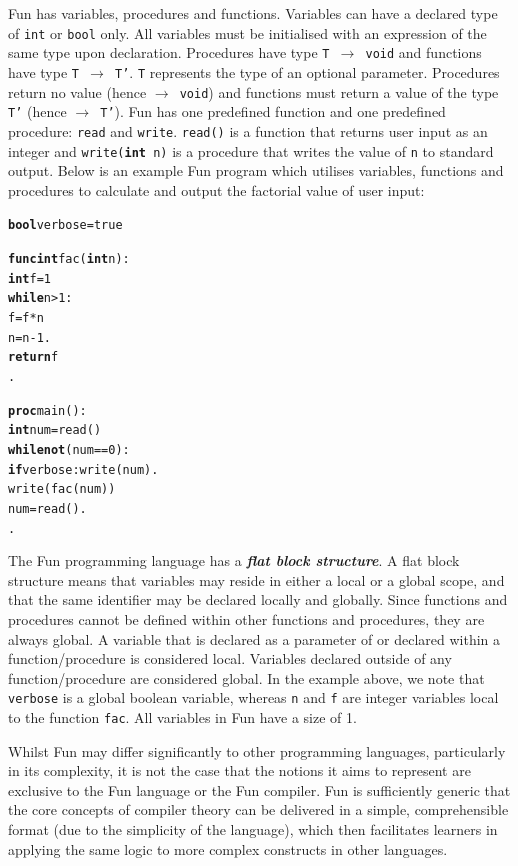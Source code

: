 \documentclass{l4proj}
\begin{document}
Fun has variables, procedures and functions. Variables can have a declared type of \texttt{int} or \texttt{bool} only. All variables must be initialised with an expression of the same type upon declaration. Procedures have type \texttt{T $\rightarrow$ void} and functions have type \texttt{T $\rightarrow$ T'}. \texttt{T} represents the type of an optional parameter. Procedures return no value (hence \texttt{$\rightarrow$ void}) and functions must return a value of the type \texttt{T'} (hence \texttt{$\rightarrow$ T'}). Fun has one predefined function and one predefined procedure: \texttt{read} and \texttt{write}. \texttt{read()} is a function that returns user input as an integer and \texttt{write(\textbf{int} n)} is a procedure that writes the value of \texttt{n} to standard output. Below is an example Fun program which utilises variables, functions and procedures to calculate and output the factorial value of user input:
\begin{alltt}
\textbf{bool} verbose = true

\textbf{func int} fac (\textbf{int} n):    
    \textbf{int} f = 1   
    \textbf{while} n > 1:    
        f = f*n   
        n = n-1  .   
    \textbf{return} f  
.  

\textbf{proc} main ():  
    \textbf{int} num = read()   
    \textbf{while not} (num == 0):    
        \textbf{if} verbose: write(num) .    
        write(fac(num))    
        num = read() .  
.
 \end{alltt}
 
The Fun programming language has a \textit{\textbf{flat block structure}}. A flat block structure means that variables may reside in either a local or a global scope, and that the same identifier may be declared locally and globally. Since functions and procedures cannot be defined within other functions and procedures, they are always global. A variable that is declared as a parameter of or declared within a function/procedure is considered local. Variables declared outside of any function/procedure are considered global. In the example above, we note that \texttt{verbose} is a global boolean variable, whereas \texttt{n} and \texttt{f} are integer variables local to the function \texttt{fac}. All variables in Fun have a size of 1.

Whilst Fun may differ significantly to other programming languages, particularly in its complexity, it is not the case that the notions it aims to represent are exclusive to the Fun language or the Fun compiler. Fun is sufficiently generic that the core concepts of compiler theory can be delivered in a simple, comprehensible format (due to the simplicity of the language), which then facilitates learners in applying the same logic to more complex constructs in other languages.
\end{document}
